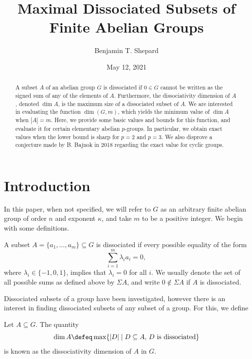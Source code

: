 \documentclass[ml, 3cm]{sdoc}
\author{Benjamin T. Shepard}
\title{Maximal Dissociated Subsets of Finite Abelian Groups}
\date{May 12, 2021}
\begin{document}
\maketitle

\begin{abstract}
    A subset $A$ of an abelian group $G$ is dissociated if $0\in G$ cannot be written as the signed sum of any of the elements of $A$. Furthermore, the dissociativity dimension of $A$, denoted $\dim A$, is the maximum size of a dissociated subset of $A$. We are interested in evaluating the function $\dim(G, m)$, which yields the minimum value of $\dim A$ when $|A|=m$. Here, we provide some basic values and bounds for this function, and evaluate it for certain elementary abelian $p$-groups. In particular, we obtain exact values when the lower bound is sharp for $p=2$ and $p=3$. We also disprove a conjecture made by B. Bajnok in 2018 regarding the exact value for cyclic groups.
\end{abstract}

\tableofcontents

\section{Introduction}

In this paper, when not specified, we will refer to $G$ as an arbitrary finite abelian group of order $n$ and exponent $\kappa$, and take $m$ to be a positive integer. We begin with some definitions.

\begin{definition}
    A subset $A=\{a_1,\ldots,a_m\}\subseteq G$ is dissociated if every possible equality of the form
    \[\sum_{i=1}^m \lambda_i a_i = 0,\]
    where $\lambda_i\in\{-1,0,1\}$, implies that $\lambda_i=0$ for all $i$. We usually denote the set of all possible sums as defined above by $\Sigma A$, and write $0\notin\Sigma A$ if $A$ is dissociated.
\end{definition}

Dissociated subsets of a group have been investigated, however there is an interest in finding dissociated subsets of any subset of a group. For this, we define

\begin{definition}
Let $A\subseteq G$. The quantity
    \[\dim A \defeq \max\{|D|\mid D \subseteq A,\, D\ \mathrm{is\ dissociated}\}\]
    is known as the dissociativity dimension of $A$ in $G$.
\end{definition}
\end{document}
